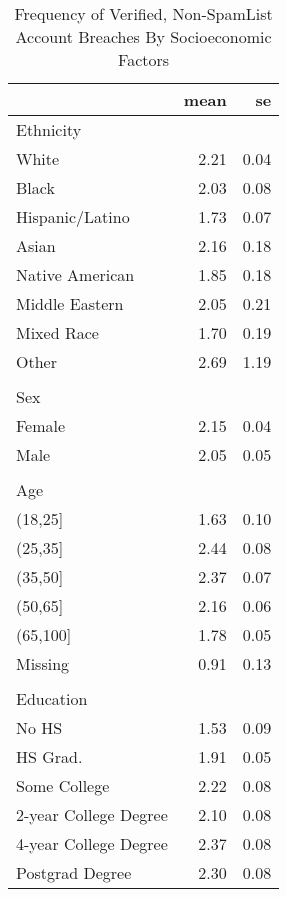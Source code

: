 \begin{table}[!htb]
\centering
\caption{Frequency of Verified, Non-SpamList Account Breaches By Socioeconomic Factors} 
\label{table:socdem_verified_dat}
\begingroup\small
\begin{tabular}{lrr}
  \hline
 & mean & se \\ 
  \hline
Ethnicity &  &  \\ 
  White & 2.21 & 0.04 \\ 
  Black & 2.03 & 0.08 \\ 
  Hispanic/Latino & 1.73 & 0.07 \\ 
  Asian & 2.16 & 0.18 \\ 
  Native American & 1.85 & 0.18 \\ 
  Middle Eastern & 2.05 & 0.21 \\ 
  Mixed Race & 1.70 & 0.19 \\ 
  Other & 2.69 & 1.19 \\
   &  &  \\
  Sex &  &  \\ 
  Female & 2.15 & 0.04 \\ 
  Male & 2.05 & 0.05 \\ 
   &  &  \\ 
  Age &  &  \\ 
  (18,25] & 1.63 & 0.10 \\ 
  (25,35] & 2.44 & 0.08 \\ 
  (35,50] & 2.37 & 0.07 \\ 
  (50,65] & 2.16 & 0.06 \\ 
  (65,100] & 1.78 & 0.05 \\ 
  Missing & 0.91 & 0.13 \\ 
   &  &  \\ 
  Education &  &  \\ 
  No HS & 1.53 & 0.09 \\ 
  HS Grad. & 1.91 & 0.05 \\ 
  Some College & 2.22 & 0.08 \\ 
  2-year College Degree & 2.10 & 0.08 \\ 
  4-year College Degree & 2.37 & 0.08 \\ 
  Postgrad Degree & 2.30 & 0.08 \\ 
   \hline
\end{tabular}
\endgroup
\end{table}
